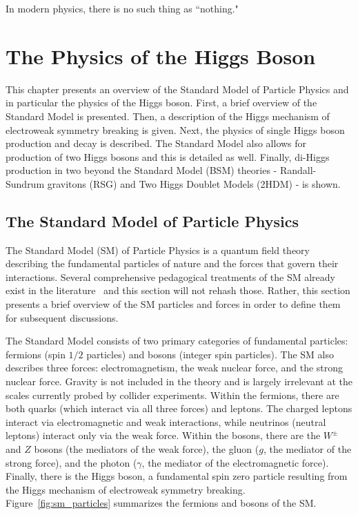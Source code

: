 \begin{savequote}[75mm]
‎In modern physics, there is no such thing as ``nothing."
\end{savequote}

\chapter{The Physics of the Higgs Boson}

This chapter presents an overview of the Standard Model of Particle Physics and in particular the physics of the Higgs boson. First, a brief overview of the Standard Model is presented. Then, a description of the Higgs mechanism of electroweak symmetry breaking is given. Next, the physics of single Higgs boson production and decay is described. The Standard Model also allows for production of two Higgs bosons and this is detailed as well. Finally, di-Higgs production in two beyond the Standard Model (BSM) theories - Randall-Sundrum gravitons (RSG) and Two Higgs Doublet Models (2HDM) - is shown. 

\section{The Standard Model of Particle Physics}

The Standard Model (SM) of Particle Physics is a quantum field theory describing the fundamental particles of nature and the forces that govern their interactions. Several comprehensive pedagogical treatments of the SM already exist in the literature~\cite{Griffiths,HalzenAndMartin,Tully,PDG,Schwartz,Dawson} and this section will not rehash those. Rather, this section presents a brief overview of the SM particles and forces in order to define them for subsequent discussions. 

The Standard Model consists of two primary categories of fundamental particles: fermions (spin $1/2$ particles) and bosons (integer spin particles). The SM also describes three forces: electromagnetism, the weak nuclear force, and the strong nuclear force. Gravity is not included in the theory and is largely irrelevant at the scales currently probed by collider experiments. Within the fermions, there are both quarks (which interact via all three forces) and leptons. The charged leptons interact via electromagnetic and weak interactions, while neutrinos (neutral leptons) interact only via the weak force. Within the bosons, there are the $W^{\pm}$ and $Z$ bosons (the mediators of the weak force), the gluon ($g$, the mediator of the strong force), and the photon ($\gamma$, the mediator of the electromagnetic force). Finally, there is the Higgs boson, a fundamental spin zero particle resulting from the Higgs mechanism of electroweak symmetry breaking.  Figure~\ref{fig:sm_particles} summarizes the fermions and bosons of the SM. 

